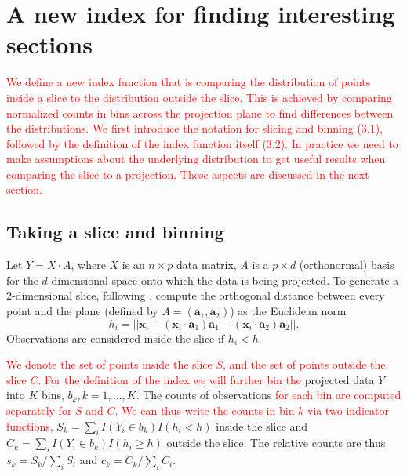 \documentclass[]{interact}
\theoremstyle{plain}%
\theoremstyle{definition}
\theoremstyle{remark}
\begin{document}
\hypertarget{a-new-index-for-finding-interesting-sections}{%
\section{\texorpdfstring{A new index for finding interesting sections
\label{sec:index}}{A new index for finding interesting sections }}\label{a-new-index-for-finding-interesting-sections}}

\textcolor{red}{We define a new index function that is comparing the distribution of points inside a slice to the distribution outside the slice. This is achieved by comparing normalized counts in bins across the projection plane to find differences between the distributions. We first introduce the notation for slicing and binning (3.1), followed by the definition of the index function itself (3.2).
In practice we need to make assumptions about the underlying distribution to get useful results when comparing the slice to a projection. These aspects are discussed in the next section.
}

\hypertarget{taking-a-slice-and-binning}{%
\subsection{Taking a slice and
binning}\label{taking-a-slice-and-binning}}

Let \(Y=X\cdot A\), where \(X\) is an \(n\times p\) data matrix, \(A\)
is a \(p\times d\) (orthonormal) basis for the \(d\)-dimensional space
onto which the data is being projected. To generate a 2-dimensional
slice, following \citet{laa2019slice}, compute the orthogonal distance
between every point and the plane (defined by
\(A = (\mathbf{a}_1, \mathbf{a}_2)\)) as the Euclidean norm
\begin{equation}
h_i = ||\mathbf{x}_i - (\mathbf{x}_i\cdot \mathbf{a}_1) \mathbf{a}_1 - (\mathbf{x}_i\cdot \mathbf{a}_2) \mathbf{a}_2||.
\end{equation} Observations are considered inside the slice if
\(h_i < h\).

\textcolor{red}{We denote the set of points inside the slice $S$, and the set of points outside the slice $C$. For the definition of the index we will further bin the}
projected data \(Y\) into \(K\) bins, \(b_k, k=1, ..., K\). The counts
of observations
\textcolor{red}{for each bin are computed separately for $S$ and $C$. We can thus write the counts in bin $k$ via two indicator functions,}
\(S_{k}=\sum_{i} I(Y_i \in b_{k})I(h_i < h)\) inside the slice and
\(C_{k}=\sum_{i} I(Y_i \in b_{k})I(h_i \geq h)\) outside the slice. The
relative counts are thus \(s_k = S_k / \sum_i S_i\) and
\(c_k = C_k / \sum_i C_i\).
\end{document}
